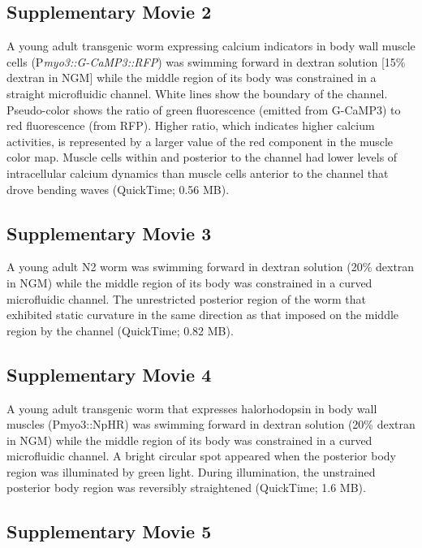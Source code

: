 \subsection{Supplementary Movie 2}\label{movie:prop2}
 
A young adult transgenic worm expressing calcium indicators in body wall muscle cells 
(P\textit{myo3::G-CaMP3::RFP}) was swimming forward in dextran solution [15\% dextran in NGM] 
while the middle region of its body was constrained in a straight microfluidic channel. White 
lines show the boundary of the channel. Pseudo-color shows the ratio of green fluorescence 
(emitted from G-CaMP3) to red fluorescence (from RFP). Higher ratio, which indicates higher 
calcium activities, is represented by a larger value of the red component in the muscle color map. 
Muscle cells within and posterior to the channel had lower levels of intracellular calcium 
dynamics than muscle cells anterior to the channel that drove bending waves (QuickTime; 0.56 
MB).   
 
\subsection{Supplementary Movie 3 }\label{movie:prop3}
 
A young adult N2 worm was swimming forward in dextran solution (20\% dextran in NGM) 
while the middle region of its body was constrained in a curved microfluidic channel. The 
unrestricted posterior region of the worm that exhibited static curvature in the same direction as 
that imposed on the middle region by the channel (QuickTime; 0.82 MB). 
 
\subsection{Supplementary Movie 4 }\label{movie:prop4}
 
A young adult transgenic worm that expresses halorhodopsin in body wall muscles 
(Pmyo3::NpHR) was swimming forward in dextran solution (20\% dextran in NGM) while the 
middle region of its body was constrained in a curved microfluidic channel. A bright circular spot 
appeared when the posterior body region was illuminated by green light. During illumination, the 
unstrained posterior body region was reversibly straightened (QuickTime; 1.6 MB). 
 
\subsection{Supplementary Movie 5 }\label{movie:prop5}
 
